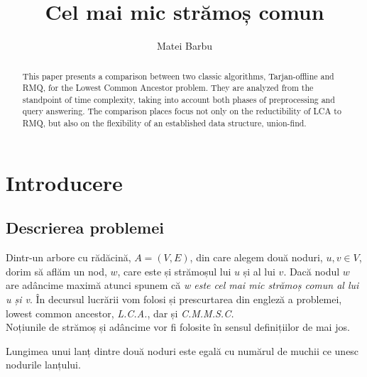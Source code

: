 \documentclass[runningheads]{llncs}
\begin{document}
%
\title{Cel mai mic strămoș comun}
%
%
\author{Matei Barbu}
%
%
\maketitle              %
%
\begin{abstract}
This paper presents a comparison between two classic algorithms, Tarjan-offline and RMQ, for the Lowest Common Ancestor problem. They are analyzed from the standpoint of time complexity, taking into account both phases of preprocessing and query answering. The comparison places focus not only on the reductibility of LCA to RMQ, but also on the flexibility of an established data structure, union-find.

\end{abstract}
%
%
%
\section{Introducere}

\subsection{Descrierea problemei}

Dintr-un arbore cu rădăcină, $A = (V,E)$, din care alegem două noduri, $u,v \in V$, dorim să aflăm un nod, $w$, care este și strămoșul lui $u$ și al lui $v$. Dacă nodul $w$ are adâncime maximă atunci spunem că \emph{w este cel mai mic strămoș comun al lui u și v}. În decursul lucrării vom folosi și prescurtarea din engleză a problemei, lowest common ancestor, \emph{L.C.A.}, dar și \emph{C.M.M.S.C.} \\
Noțiunile de strămoș și adâncime vor fi folosite în sensul definițiilor de mai jos.

\renewcommand{\definitionname}{Definiția}
\begin{definition}
Lungimea unui lanț dintre două noduri este egală cu numărul de muchii ce unesc nodurile lanțului.
\end{definition}
\end{document}
